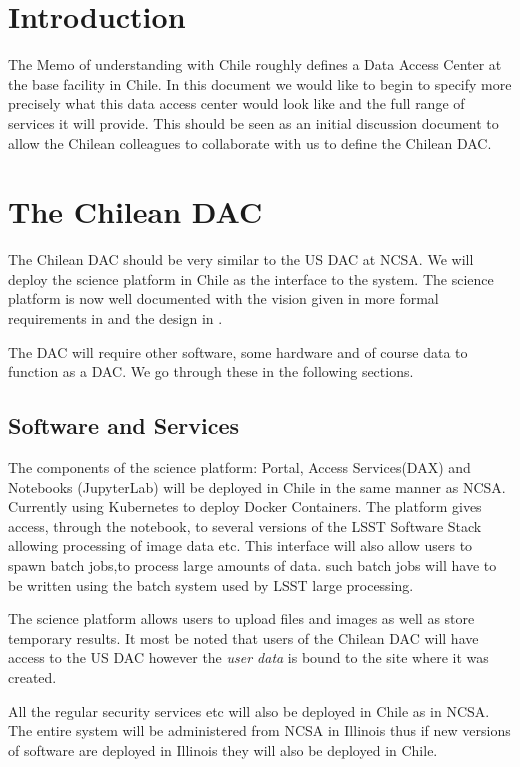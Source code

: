 \section{Introduction}


The Memo of understanding with Chile roughly defines a Data Access Center at the base facility in Chile.
In this document we would like to begin to specify more precisely what this data access center would look like and
the full range of services it will provide. This should be seen as an initial discussion document to allow the Chilean colleagues to collaborate with us to define the Chilean DAC.

\section{The Chilean DAC}

The Chilean DAC should be very similar to the US DAC at NCSA. We will deploy the  science platform in Chile as the interface to the system. The science platform is now well documented with the vision  given in 
more formal requirements in  and the design in .

The DAC will require other software, some  hardware and of course data to function as a DAC. We go through these in the following sections.


\subsection{Software and Services }
The components of the science platform: Portal, Access Services(DAX) and Notebooks (JupyterLab) will be deployed in Chile in the same manner as NCSA. Currently using Kubernetes to deploy Docker Containers.
The platform gives access, through the notebook, to several versions of the LSST Software Stack allowing processing of image data etc. This interface will also allow users to spawn batch jobs,to process large amounts of data. such batch jobs will have to be written using the batch system used by LSST large processing.

The science platform allows users to upload files and images as well as store temporary results. It most be noted that users of the Chilean DAC will have access to the US DAC however the \emph{user data} is bound to the site where it was created.

All the regular security services etc will also be deployed in Chile as in NCSA. The entire system will be administered from NCSA in Illinois thus if new versions of software are deployed in Illinois they will also be deployed in Chile.

